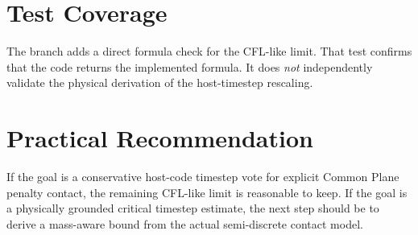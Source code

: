 \documentclass[11pt]{article}
\begin{document}
\section{Test Coverage}

The branch adds a direct formula check for the CFL-like limit. That test confirms that the code returns the implemented formula. It does \emph{not} independently validate the physical derivation of the host-timestep rescaling.

\section{Practical Recommendation}

If the goal is a conservative host-code timestep vote for explicit Common Plane penalty contact, the remaining CFL-like limit is reasonable to keep. If the goal is a physically grounded critical timestep estimate, the next step should be to derive a mass-aware bound from the actual semi-discrete contact model.
\end{document}
